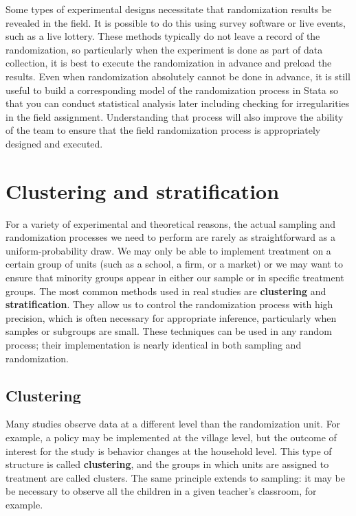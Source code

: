 
Some types of experimental designs necessitate that randomization results be revealed in the field.
It is possible to do this using survey software or live events, such as a live lottery.
These methods typically do not leave a record of the randomization,
so particularly when the experiment is done as part of data collection,
it is best to execute the randomization in advance and preload the results.
Even when randomization absolutely cannot be done in advance, it is still useful
to build a corresponding model of the randomization process in Stata
so that you can conduct statistical analysis later
including checking for irregularities in the field assignment.
Understanding that process will also improve the ability of the team
to ensure that the field randomization process is appropriately designed and executed.



\section{Clustering and stratification}

For a variety of experimental and theoretical reasons,
the actual sampling and randomization processes we need to perform
are rarely as straightforward as a uniform-probability draw.
We may only be able to implement treatment on a certain group of units
(such as a school, a firm, or a market)
or we may want to ensure that minority groups appear
in either our sample or in specific treatment groups.
The most common methods used in real studies are \textbf{clustering} and \textbf{stratification}.
They allow us to control the randomization process with high precision,
which is often necessary for appropriate inference,
particularly when samples or subgroups are small.\cite{athey2017econometrics}
These techniques can be used in any random process;
their implementation is nearly identical in both sampling and randomization.

\subsection{Clustering}

Many studies observe data at a different level than the randomization unit.
For example, a policy may be implemented at the village level,
but the outcome of interest for the study is behavior changes at the household level.
This type of structure is called \textbf{clustering},
and the groups in which units are assigned to treatment are called clusters.
The same principle extends to sampling:
it may be be necessary to observe all the children
in a given teacher's classroom, for example.


